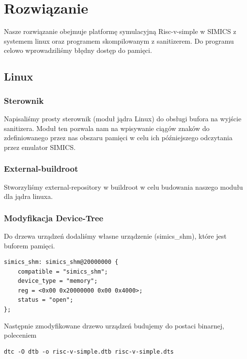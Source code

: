 \documentclass[../main.tex]{subfiles}
\begin{document}
	
	
\section{Rozwiązanie}
Nasze rozwiązanie obejmuje platformę symulacyjną Risc-v-simple w SIMICS z systemem linux oraz programem skompilowanym z sanitizerem. Do programu celowo wprowadziliśmy błędny dostęp do pamięci.

\subsection{Linux}

\subsubsection{Sterownik}
Napisaliśmy prosty sterownik (moduł jądra Linux) do obsługi bufora na wyjście sanitizera. Moduł ten pozwala nam na wpisywanie ciągów znaków do zdefiniowanego przez nas obszaru pamięci w celu ich późniejszego odczytania przez emulator SIMICS.


\subsubsection{External-buildroot}
Stworzyliśmy external-repository w buildroot w celu budowania naszego modułu dla jądra linuxa.

\subsubsection{Modyfikacja Device-Tree}
	Do drzewa urządzeń dodaliśmy własne urządzenie (simics_shm), które jest buforem pamięci.
	\begin{listing}
		\begin{verbatim}
simics_shm: simics_shm@20000000 {
	compatible = "simics_shm";
	device_type = "memory";
	reg = <0x00 0x20000000 0x00 0x4000>;
	status = "open";
};
		\end{verbatim}
	\end{listing}
	Następnie zmodyfikowane drzewo urządzeń budujemy do postaci binarnej, poleceniem 
	
	\begin{listing}
		\begin{verbatim}
dtc -O dtb -o risc-v-simple.dtb risc-v-simple.dts
		\end{verbatim}
	\end{listing}
\end{document}
